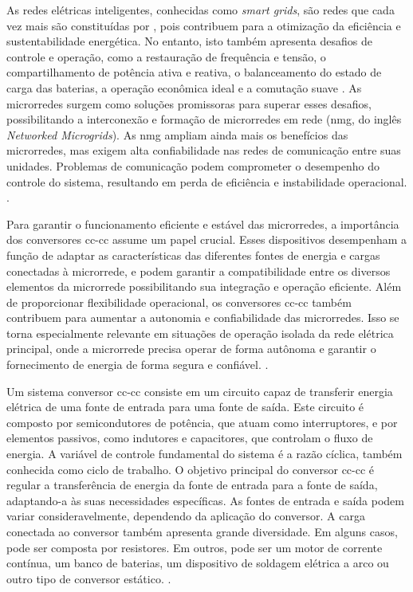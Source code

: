 As redes elétricas inteligentes, conhecidas como \textit{smart grids}, são redes que cada vez mais são constituídas por , pois contribuem para a otimização da eficiência e sustentabilidade energética. No entanto, isto também apresenta desafios de controle e operação, como a restauração de frequência e tensão, o compartilhamento de potência ativa e reativa, o balanceamento do estado de carga das baterias, a operação econômica ideal e a comutação suave \cite{Zhou2020}. As microrredes surgem como soluções promissoras para superar esses desafios, possibilitando a interconexão e formação de microrredes em rede (\acrshort{nmg}, do inglês \textit{Networked Microgrids}). As \acrshort{nmg} ampliam ainda mais os benefícios das microrredes, mas exigem alta confiabilidade nas redes de comunicação entre suas unidades. Problemas de comunicação podem comprometer o desempenho do controle do sistema, resultando em perda de eficiência e instabilidade operacional. \cite{Zhou2020}.

Para garantir o funcionamento eficiente e estável das microrredes, a importância dos conversores \acrshort{cc}-\acrshort{cc} assume um papel crucial. Esses dispositivos desempenham a função de adaptar as características das diferentes fontes de energia e cargas conectadas à microrrede, e podem garantir a compatibilidade entre os diversos elementos da microrrede possibilitando sua integração e operação eficiente. Além de proporcionar flexibilidade operacional, os conversores \acrshort{cc}-\acrshort{cc} também contribuem para aumentar a autonomia e confiabilidade das microrredes. Isso se torna especialmente relevante em situações de operação isolada da rede elétrica principal, onde a microrrede precisa operar de forma autônoma e garantir o fornecimento de energia de forma segura e confiável. \cite{bessa2022}.

Um sistema conversor \acrshort{cc}-\acrshort{cc} consiste em um circuito capaz de transferir energia elétrica de uma fonte de entrada para uma fonte de saída. Este circuito é composto por semicondutores de potência, que atuam como interruptores, e por elementos passivos, como indutores e capacitores, que controlam o fluxo de energia. A variável de controle fundamental do sistema é a razão cíclica, também conhecida como ciclo de trabalho. O objetivo principal do conversor \acrshort{cc}-\acrshort{cc} é regular a transferência de energia da fonte de entrada para a fonte de saída, adaptando-a às suas necessidades específicas. As fontes de entrada e saída podem variar consideravelmente, dependendo da aplicação do conversor. A carga conectada ao conversor também apresenta grande diversidade. Em alguns casos, pode ser composta por resistores. Em outros, pode ser um motor de corrente contínua, um banco de baterias, um dispositivo de soldagem elétrica a arco ou outro tipo de conversor estático. \cite{martins2008}.


